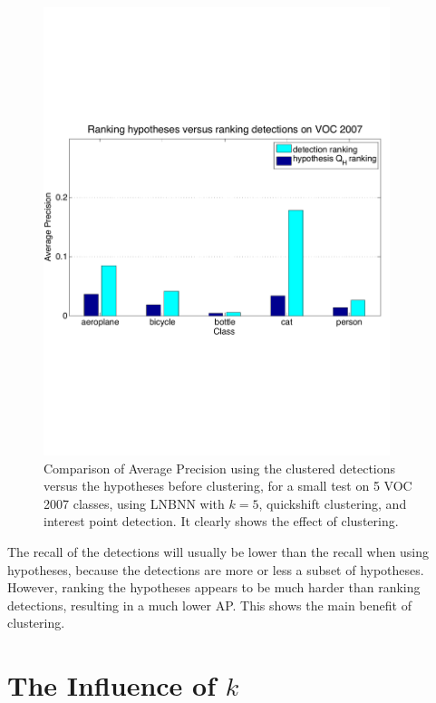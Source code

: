 \begin{figure}[hbt]
    \centering
    \includegraphics[width=0.9\textwidth]{APcomparehypdet}
    \caption{Comparison of Average Precision using the clustered detections versus the hypotheses before clustering, for a small test on 5 VOC 2007 classes, using LNBNN with $k=5$, quickshift clustering, and interest point detection. It clearly shows the effect of clustering.}
    \label{fig:hyprank}
\end{figure}

The recall of the detections will usually be lower than the recall when using hypotheses, because the detections are more or less a subset of hypotheses. However, ranking the hypotheses appears to be much harder than ranking detections, resulting in a much lower AP. This shows the main benefit of clustering.


\section{The Influence of $k$} %
\label{sub:the_influence_of_k_}

